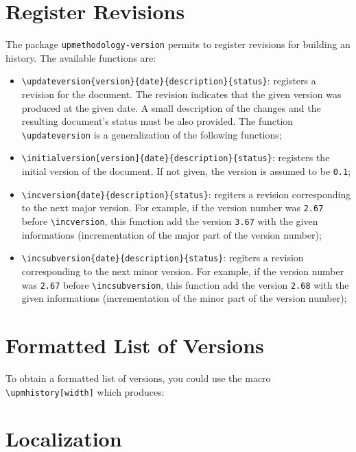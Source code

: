 \documentclass[book]{upmethodology-document}
\begin{document}
\section{Register Revisions}

The package \texttt{upmethodology-version} permits to register revisions for building an history. The available functions are:
\begin{itemize}
\item \texttt{{\textbackslash}updateversion\{version\}\{date\}\{description\}\{status\}}: registers a revision for the document. The revision indicates that the given version was produced at the given date. A small description of the changes and the resulting document's status must be also provided. The function \texttt{{\textbackslash}updateversion} is a generalization of the following functions;

\item \texttt{{\textbackslash}initialversion[version]\{date\}\{description\}\{status\}}: registers the initial version of the document. If not given, the version is assumed to be \texttt{0.1};

\item \texttt{{\textbackslash}incversion\{date\}\{description\}\{status\}}: regiters a revision corresponding to the next major version. For example, if the version number was \texttt{2.67} before \texttt{{\textbackslash}incversion}, this function add the version \texttt{3.67} with the given informations (incrementation of the major part of the version number);

\item \texttt{{\textbackslash}incsubversion\{date\}\{description\}\{status\}}: regiters a revision corresponding to the next minor version. For example, if the version number was \texttt{2.67} before \texttt{{\textbackslash}incsubversion}, this function add the version \texttt{2.68} with the given informations (incrementation of the minor part of the version number);
\end{itemize}

\section{Formatted List of Versions}

To obtain a formatted list of versions, you could use the macro \texttt{{\textbackslash}upmhistory[width]} which produces:

\upmhistory

\section{Localization}
\end{document}
